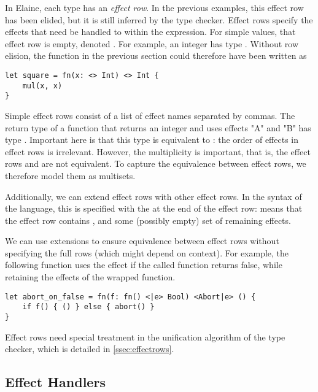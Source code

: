 In Elaine, each type has an \emph{effect row}. In the previous examples, this effect row has been elided, but it is still inferred by the type checker. Effect rows specify the effects that need be handled to within the expression. For simple values, that effect row is empty, denoted \el{<>}. For example, an integer has type . Without row elision, the  function in the previous section could therefore have been written as

\begin{lstlisting}[language=elaine, style=fancy]
let square = fn(x: <> Int) <> Int {
    mul(x, x)
}
\end{lstlisting}

Simple effect rows consist of a list of effect names separated by commas. The return type of a function that returns an integer and uses effects "A" and "B" has type . Important here is that this type is equivalent to : the order of effects in effect rows is irrelevant. However, the multiplicity is important, that is,  the effect rows  and  are not equivalent. To capture the equivalence between effect rows, we therefore model them as multisets.

Additionally, we can extend effect rows with other effect rows. In the syntax of the language, this is specified with the \el{|} at the end of the effect row:  means that the effect row contains ,  and some (possibly empty) set of remaining effects.

We can use extensions to ensure equivalence between effect rows without specifying the full rows (which might depend on context). For example, the following function uses the  effect if the called function returns false, while retaining the effects of the wrapped function.

\begin{lstlisting}[language=elaine, style=fancy]
let abort_on_false = fn(f: fn() <|e> Bool) <Abort|e> () {
    if f() { () } else { abort() }
}
\end{lstlisting}

Effect rows need special treatment in the unification algorithm of the type checker, which is detailed in \cref{ssec:effectrows}.

\subsection{Effect Handlers}\label{sec:alghandlers}

